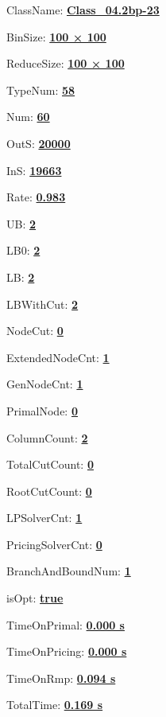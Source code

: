 \documentclass[11pt]{article}
\begin{document}
\pagestyle{empty}


ClassName: \underline{\textbf{Class_04.2bp-23}}
\par
BinSize: \underline{\textbf{100 × 100}}
\par
ReduceSize: \underline{\textbf{100 × 100}}
\par
TypeNum: \underline{\textbf{58}}
\par
Num: \underline{\textbf{60}}
\par
OutS: \underline{\textbf{20000}}
\par
InS: \underline{\textbf{19663}}
\par
Rate: \underline{\textbf{0.983}}
\par
UB: \underline{\textbf{2}}
\par
LB0: \underline{\textbf{2}}
\par
LB: \underline{\textbf{2}}
\par
LBWithCut: \underline{\textbf{2}}
\par
NodeCut: \underline{\textbf{0}}
\par
ExtendedNodeCnt: \underline{\textbf{1}}
\par
GenNodeCnt: \underline{\textbf{1}}
\par
PrimalNode: \underline{\textbf{0}}
\par
ColumnCount: \underline{\textbf{2}}
\par
TotalCutCount: \underline{\textbf{0}}
\par
RootCutCount: \underline{\textbf{0}}
\par
LPSolverCnt: \underline{\textbf{1}}
\par
PricingSolverCnt: \underline{\textbf{0}}
\par
BranchAndBoundNum: \underline{\textbf{1}}
\par
isOpt: \underline{\textbf{true}}
\par
TimeOnPrimal: \underline{\textbf{0.000 s}}
\par
TimeOnPricing: \underline{\textbf{0.000 s}}
\par
TimeOnRmp: \underline{\textbf{0.094 s}}
\par
TotalTime: \underline{\textbf{0.169 s}}
\par
\newpage
\end{document}
